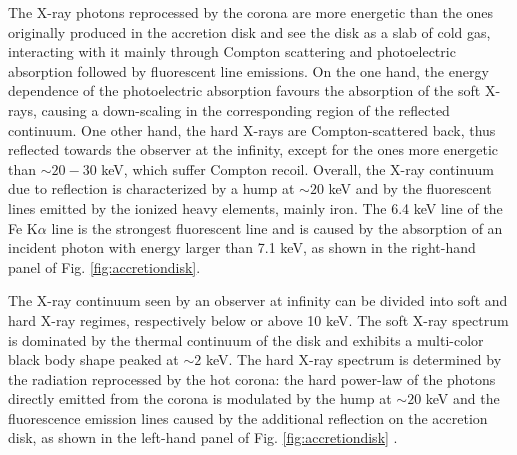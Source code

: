 \documentclass[a4paper,titlepage]{book}     	%
\begin{document}
The X-ray photons reprocessed by the corona are more energetic than the ones originally produced in the accretion disk and see the disk as a slab of cold gas, interacting with it mainly through Compton scattering and photoelectric absorption followed by fluorescent line emissions. On the one hand, the energy dependence of the photoelectric absorption favours the absorption of the soft X-rays, causing a down-scaling in the corresponding region of the reflected continuum. One other hand, the hard X-rays are Compton-scattered back, thus reflected towards the observer at the infinity, except for the ones more energetic than $\sim 20-30$ keV, which suffer Compton recoil. Overall, the X-ray continuum due to reflection is characterized by a hump at $\sim 20$ keV and by the fluorescent lines emitted by the ionized heavy elements, mainly iron. The 6.4 keV line of the Fe K$\alpha$ line is the strongest fluorescent line and is caused by the absorption of an incident photon with energy larger than 7.1 keV, as shown in the right-hand panel of Fig. \ref{fig:accretiondisk}.

The X-ray continuum seen by an observer at infinity can be divided into soft and hard X-ray regimes, respectively below or above 10 keV. The soft X-ray spectrum is dominated by the thermal continuum of the disk and exhibits a multi-color black body shape peaked at $\sim 2$ keV. The hard X-ray spectrum is determined by the radiation reprocessed by the hot corona: the hard power-law of the photons directly emitted from the corona is modulated by the hump at $\sim 20$ keV and the fluorescence emission lines caused by the additional reflection on the accretion disk, as shown in the left-hand panel of Fig. \ref{fig:accretiondisk} \cite{FeKalphaline_Fabian2000}.
\end{document}
